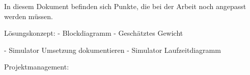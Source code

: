 
In diesem Dokument befinden sich Punkte, die bei der Arbeit noch angepasst werden müssen.


Lösungskonzept:
- Blockdiagramm
- Geschätztes Gewicht

- Simulator Umsetzung dokumentieren
- Simulator Laufzeitdiagramm

Projektmanagement:
